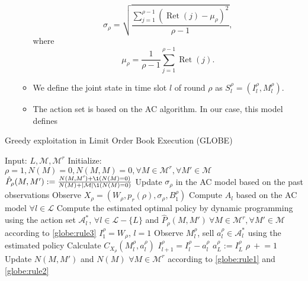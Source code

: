 \begin{enumerate}
\begin{itemize}
\begin{equation*}
                            \sigma_\rho = \sqrt{\frac{\sum_{j=1}^{\rho-1} \left(\operatorname*{Ret}(j) - \mu_\rho\right)^2}{\rho-1}},
                        \end{equation*}
                        where 
                        \begin{equation*}
                            \mu_\rho = \frac{1}{\rho-1}\sum_{j=1}^{\rho-1}\operatorname*{Ret}(j).
                        \end{equation*}
                    \item We define the joint state in time slot $l$ of round $\rho$ as $S_l^\rho = (I_l^\rho, M_l^\rho)$.
                    \item The action set is based on the AC algorithm. In our case, this model defines 
                \end{itemize}
            \end{enumerate}

            \begin{algorithm}
                \caption[GLOBE Algorithm]{Greedy exploitation in Limit Order Book Execution (GLOBE)}
                \begin{algorithmic}
                    \State Input: $L, \mathcal{M}, \mathcal{M}^r$
                    \State Initialize: $\rho = 1, N(M)=0, N(M,M)=0, \forall M \in \mathcal{M}^r , \forall M' \in \mathcal{M}$
                        \State $\hat P_\rho (M, M') := \frac{N(M, M') + \1(N(M) = 0)}{N(M) + |\mathcal M| \1 (N(M) = 0)}$
                        \State Update $\sigma_\rho$ in the AC model based on the past observations
                        \State Observe $X_\rho = (W_\rho, p_r(\rho), \sigma_\rho, B_1^\rho)$
                        \State Compute $A_l$ based on the AC model $\forall l \in \mathcal{L}$
                        \State Compute the estimated optimal policy by dynamic programming using the action set $\mathcal A_l^*$, $\forall l \in \mathcal{L} - \{L\}$ and $\hat P_\rho (M, M')\ \forall M \in \mathcal{M}^r, \forall M' \in \mathcal M$ according to \eqref{globe:rule3}
                        \State $I_1^\rho = W_\rho$, $l=1$
                            \State Observe $M_l^\rho$, sell $a_l^\rho\in \mathcal{A}^*_l$ using the estimated policy
                            \State Calculate $C_{X_\rho}(M_l^\rho, a_l^\rho)$
                            \State $I_{l+1}^\rho = I_l^\rho - a_l^\rho$
                        \EndFor
                        \State $a_{L}^\rho := I_L^\rho$
                        \State $\rho\ +\!\!= 1$
                        \State Update $N(M, M')$ and $N(M)$ $\forall M \in \mathcal{M}^r$ according to \eqref{globe:rule1} and \eqref{globe:rule2}
                    \EndWhile
                \end{algorithmic}
                \label{algorithm:GLOBE}
            \end{algorithm}
            
